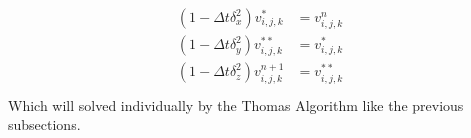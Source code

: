 \begin{eqnarray}
\begin{aligned}
		(1-\Delta t \delta_x^2)v^*_{i,j,k} &= v^n_{i,j,k}\\
		(1-\Delta t \delta_y^2)v^{**}_{i,j,k} &= v^*_{i,j,k}\\
		(1-\Delta t \delta_z^2)v^{n+1}_{i,j,k} &= v^{**}_{i,j,k}\\
	\end{aligned}
\end{eqnarray}	
Which will solved individually by the Thomas Algorithm like the previous subsections. 
%
